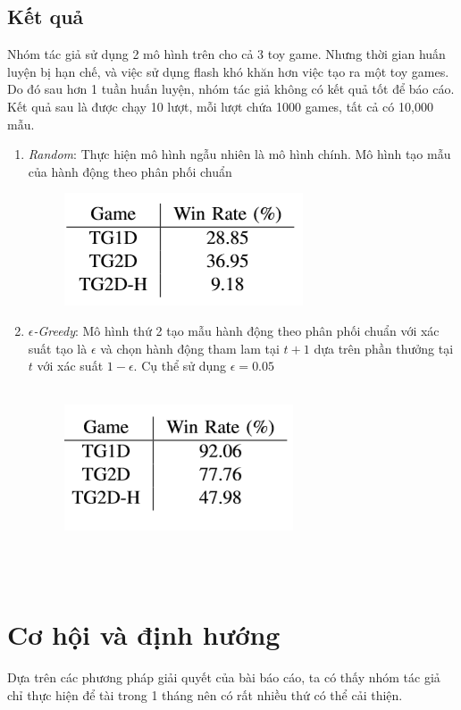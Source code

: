 \documentclass[12pt,a4paper]{article}
\begin{document}
\subsection{Kết quả}
Nhóm tác giả sử dụng 2 mô hình trên cho cả 3 toy game. Nhưng thời gian huấn luyện bị hạn chế, và việc sử dụng flash khó khăn hơn việc tạo ra một toy games. Do đó sau hơn 1 tuần huấn luyện, nhóm tác giả không có kết quả tốt để báo cáo.\\
Kết quả sau là được chạy 10 lượt, mỗi lượt chứa 1000 games, tất cả có 10,000 mẫu.
\begin{enumerate}[label=\Alph*.]
\item \textit{Random}: Thực hiện mô hình ngẫu nhiên là mô hình chính. Mô hình tạo mẫu của hành động theo phân phối chuẩn
\begin{figure}[h!]
    \centering
    \includegraphics{photo/result1.png}
\end{figure}
\item \textit{$\epsilon$-Greedy}: Mô hình thứ 2 tạo mẫu hành động theo phân phối chuẩn với xác suất tạo là $\epsilon$ và chọn hành động tham lam tại $t+1$ dựa trên phần thưởng tại $t$ với xác suất $1-\epsilon$. Cụ thể sử dụng $\epsilon=0.05$
\\
\\
\begin{figure}[h]
    \centering
    \includegraphics{photo/result2.png}
\end{figure}
\end{enumerate}
\\
\\
\section{Cơ hội và định hướng}
Dựa trên các phương pháp giải quyết của bài báo cáo\cite{report}, ta có thấy nhóm tác giả chỉ thực hiện để tài trong 1 tháng nên có rất nhiều thứ có thể cải thiện.
\end{document}
